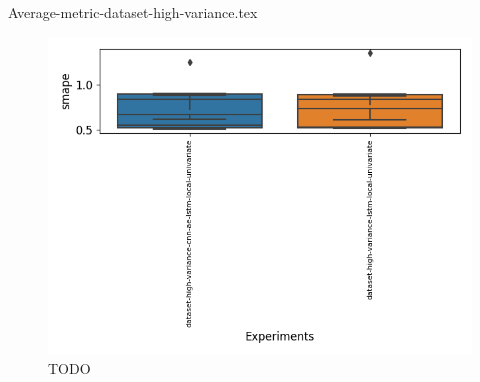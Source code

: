   {Average-metric-dataset-high-variance.tex}

  \begin{figure}[h!]
    \centering
    \includegraphics[width=\textwidth]{./figs/results/boxplot/smape-dataset_high_variance.png}
    \hfill
    \caption{TODO}
    \label{fig:results-smape-dataset-high-variance}
  \end{figure}
\fi
